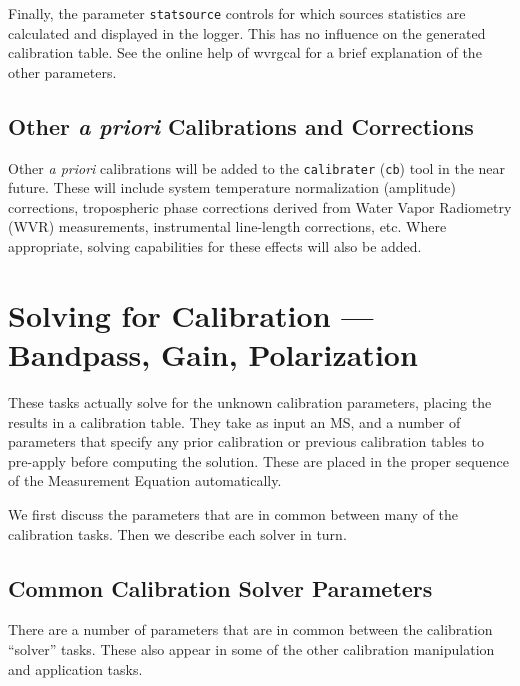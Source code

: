 Finally, the parameter {\tt statsource} controls for which sources statistics are calculated and
displayed in the logger. This has no influence on the generated calibration table.
See the online help of wvrgcal for a brief explanation of the other
parameters.


\subsection{Other {\it a priori} Calibrations and Corrections}
\label{section:cal.prior.other}

Other {\it a priori} calibrations will be added to the 
{\tt calibrater} ({\tt cb}) tool 
in the near future.  These will include
system temperature normalization (amplitude) corrections,
tropospheric phase corrections derived from Water Vapor Radiometry
(WVR) measurements, instrumental line-length corrections, etc.  Where
appropriate, solving capabilities for these effects will also be
added.

\section{Solving for Calibration --- Bandpass, Gain, Polarization}
\label{section:cal.solve}

These tasks actually solve for the unknown calibration parameters,
placing the results in a calibration table.  They take as input
an MS, and a number of parameters that specify any prior calibration
or previous calibration tables to pre-apply before computing the
solution.  These are placed in the proper sequence of the Measurement
Equation automatically.

We first discuss the parameters that are in common between many
of the calibration tasks.  Then we describe each solver in turn.

\subsection{Common Calibration Solver Parameters}
\label{section:cal.solve.pars}

There are a number of parameters that are in common between 
the calibration ``solver'' tasks.  These also appear in some
of the other calibration manipulation and application tasks.

